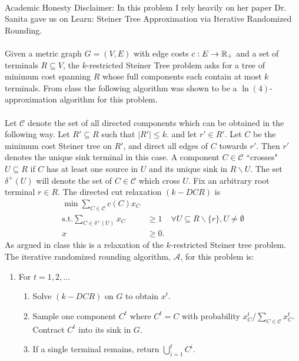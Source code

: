 \documentclass[letterpaper,12pt,oneside,onecolumn]{article}
\newcommand{\cA}{\mathcal{A}} \newcommand{\cB}{\mathcal{B}}
\newcommand{\cC}{\mathcal{C}} \newcommand{\cD}{\mathcal{D}}
\begin{document}
\paragraph{}
Academic Honesty Disclaimer: In this problem I rely heavily on her paper Dr. Sanita gave us on Learn: Steiner Tree Approximation via Iterative Randomized Rounding.
\paragraph{}
Given a metric graph $G=(V,E)$ with edge costs $c:E\rightarrow \mathbb{R}_+$ and a set of terminals $R\subseteq V$, the $k$-restricted Steiner Tree problem asks for a tree of minimum cost spanning $R$ whose full components each contain at most $k$ terminals. From class the following algorithm was shown to be a $\ln(4)$-approximation algorithm for this problem.
\paragraph{}
Let $\cC$ denote the set of all directed components which can be obtained in the following way. Let $R' \subseteq R$ such that $|R'| \leq k$. and let $r' \in R'$. Let $C$ be the minimum cost Steiner tree on $R'$, and direct all edges of $C$ towards $r'$. Then $r'$ denotes the unique sink terminal in this case. A component $C \in \cC$ ``crosses" $U\subseteq R$ if $C$ has at least one source in $U$ and its unique sink in $R\backslash U$. The set $\delta^+(U)$ will denote the set of $C \in \cC$ which cross $U$. Fix an arbitrary root terminal $r \in R$. The directed cut relaxation $(k-DCR)$ is
\begin{align*}
\min \sum_{C\in \cC} c(C)x_C& \\
\text{s.t.} \sum_{C\in\delta^+(U)} x_C &\geq 1 &\forall U\subseteq R\backslash \{r\}, U\neq \emptyset \\
x&\geq 0.
\end{align*}
As argued in class this is a relaxation of the $k$-restricted Steiner tree problem. The iterative randomized rounding algorithm, $\cA$, for this problem is:
\begin{enumerate}
\item For $t =1,2,\dots$
\begin{enumerate}
\item Solve $(k-DCR)$ on $G$ to obtain $x^t$.
\item Sample one component $C^t$ where $C^t=C$ with probability $x^t_C/\sum_{C\in\cC} x^t_C$. Contract $C^t$ into its sink in $G$.
\item If a single terminal remains, return $\bigcup_{i=1}^t C^i$.
\end{enumerate}
\end{enumerate}
\end{document}

